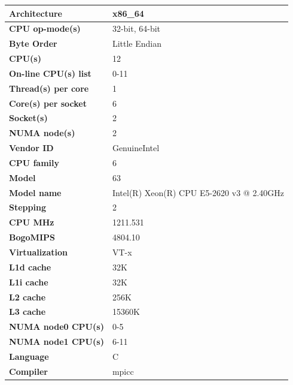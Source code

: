 \documentclass[12,a4paper]{article}
\begin{document}
    \begin{table}[H]
        \centering
        \begin{tabular}{ |P{0.4\textwidth}|P{0.6\textwidth}|}
            \hline
            \textbf{Architecture} & x86\_64\\
            \hline
            \textbf{CPU op-mode(s)} & 32-bit, 64-bit\\
            \hline
            \textbf{Byte Order} & Little Endian\\
            \hline
            \textbf{CPU(s)} & 12\\
            \hline
            \textbf{On-line CPU(s) list} & 0-11\\
            \hline
            \textbf{Thread(s) per core} & 1\\
            \hline
            \textbf{Core(s) per socket} & 6\\
            \hline
            \textbf{Socket(s)} & 2\\
            \hline
            \textbf{NUMA node(s)} & 2\\
            \hline
            \textbf{Vendor ID} & GenuineIntel\\
            \hline
            \textbf{CPU family} & 6\\
            \hline
            \textbf{Model} & 63\\
            \hline
            \textbf{Model name} & Intel(R) Xeon(R) CPU E5-2620 v3 @ 2.40GHz\\
            \hline
            \textbf{Stepping} & 2\\
            \hline
            \textbf{CPU MHz} & 1211.531\\
            \hline
            \textbf{BogoMIPS} & 4804.10\\
            \hline
            \textbf{Virtualization} & VT-x\\
            \hline
            \textbf{L1d cache} & 32K\\
            \hline
            \textbf{L1i cache} & 32K\\
            \hline
            \textbf{L2 cache} & 256K\\
            \hline
            \textbf{L3 cache} & 15360K\\
            \hline
            \textbf{NUMA node0 CPU(s)} & 0-5\\
            \hline
            \textbf{NUMA node1 CPU(s)} & 6-11\\
            \hline\hline
            \textbf{Language} & C\\
            \hline
            \textbf{Compiler} & mpicc\\
            \hline
        \end{tabular}
    \end{table}
    \newpage
\end{document}
